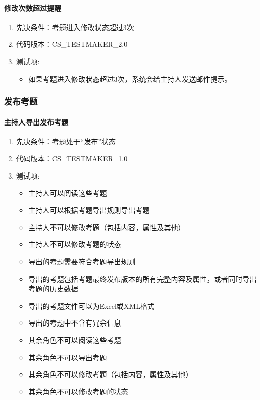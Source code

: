 \documentclass[hyperref, a4paper]{ctexart}
\providecommand{\tightlist}{%
  \setlength{\itemsep}{0pt}\setlength{\parskip}{0pt}}
\let\oldparagraph\paragraph
\renewcommand{\paragraph}[1]{\oldparagraph{#1}\mbox{}}
\begin{document}
\hypertarget{ux4feeux6539ux6b21ux6570ux8d85ux8fc7ux63d0ux9192}{%
\paragraph{修改次数超过提醒}\label{ux4feeux6539ux6b21ux6570ux8d85ux8fc7ux63d0ux9192}}

\begin{enumerate}
\def\labelenumi{\arabic{enumi}.}
\tightlist
\item
  先决条件：考题进入修改状态超过3次
\item
  代码版本：CS\_TESTMAKER\_2.0
\item
  测试项:

  \begin{itemize}
  \tightlist
  \item
    如果考题进入修改状态超过3次，系统会给主持人发送邮件提示。
  \end{itemize}
\end{enumerate}

\hypertarget{ux53d1ux5e03ux8003ux9898}{%
\subsubsection{发布考题}\label{ux53d1ux5e03ux8003ux9898}}

\hypertarget{ux4e3bux6301ux4ebaux5bfcux51faux53d1ux5e03ux8003ux9898}{%
\paragraph{主持人导出发布考题}\label{ux4e3bux6301ux4ebaux5bfcux51faux53d1ux5e03ux8003ux9898}}

\begin{enumerate}
\def\labelenumi{\arabic{enumi}.}
\tightlist
\item
  先决条件：考题处于``发布''状态
\item
  代码版本：CS\_TESTMAKER\_1.0
\item
  测试项:

  \begin{itemize}
  \tightlist
  \item
    主持人可以阅读这些考题
  \item
    主持人可以根据考题导出规则导出考题
  \item
    主持人不可以修改考题（包括内容，属性及其他）
  \item
    主持人不可以修改考题的状态
  \item
    导出的考题需要符合考题导出规则
  \item
    导出的考题包括考题最终发布版本的所有完整内容及属性，或者同时导出考题的历史数据
  \item
    导出的考题文件可以为Excel或XML格式
  \item
    导出的考题中不含有冗余信息
  \item
    其余角色不可以阅读这些考题
  \item
    其余角色不可以导出考题
  \item
    其余角色不可以修改考题（包括内容，属性及其他）
  \item
    其余角色不可以修改考题的状态
  \end{itemize}
\end{enumerate}
\end{document}
